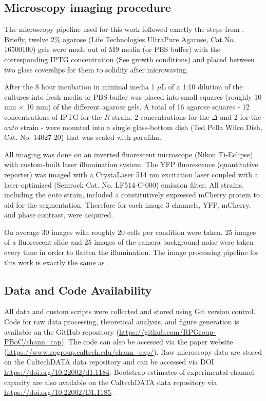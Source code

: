 \subsection{Microscopy imaging procedure}

The microscopy pipeline used for this work followed exactly the steps from
\cite{Razo-Mejia2018}. Briefly, twelve 2\% agarose (Life Technologies UltraPure
Agarose, Cat.No. 16500100) gels were made out of M9 media (or PBS buffer) with
the corresponding IPTG concentration (See growth conditions) and placed between
two glass coverslips for them to solidify after microwaving.

After the 8 hour incubation in minimal media 1 $\mu$L of a 1:10 dilution of the
cultures into fresh media or PBS buffer was placed into small squares (roughly
10 mm $\times$ 10 mm) of the different agarose gels. A total of 16 agarose
squares - 12 concentrations of IPTG for the $R$ strain, 2 concentrations for
the $\Delta$ and 2 for the $auto$ strain - were mounted into a single
glass-bottom dish (Ted Pella Wilco Dish, Cat. No. 14027-20) that was sealed
with parafilm.

All imaging was done on an inverted fluorescent microscope (Nikon Ti-Eclipse)
with custom-built laser illumination system. The YFP fluorescence (quantitative
reporter) was imaged with a CrystaLaser 514 nm excitation laser coupled with a
laser-optimized (Semrock Cat. No. LF514-C-000) emission filter. All strains,
including the $auto$ strain, included a constitutively expressed mCherry
protein to aid for the segmentation. Therefore for each image 3 channels, YFP,
mCherry, and phase contrast, were acquired.

On average 30 images with roughly 20 cells per condition were taken. 25 images
of a fluorescent slide and 25 images of the camera background noise were taken
every time in order to flatten the illumination. The image  processing pipeline
for this work is exactly the same as \cite{Razo-Mejia2018}.

\subsection{Data and Code Availability}

All data and custom scripts were collected and stored using Git version
control. Code for raw data processing, theoretical analysis, and figure
generation is available on the GitHub repository
(\url{https://github.com/RPGroup-PBoC/chann_cap}). The code can also be
accessed via the paper website
(\url{https://www.rpgroup.caltech.edu/chann_cap/}). Raw microscopy data are
stored on the CaltechDATA data repository and can be accessed via DOI
\url{https://doi.org/10.22002/d1.1184}. Bootstrap estimates of experimental
channel capacity are also available on the CaltechDATA data repository via
\url{https://doi.org/10.22002/D1.1185}.
